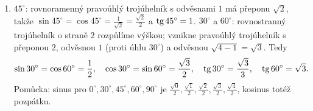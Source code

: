 \begin{enumerate}[label=\textbf{\arabic*.}, leftmargin=*, itemsep=0.8em]
  \item {}
  $45^\circ$: rovnoramenný pravoúhlý trojúhelník s odvěsnami $1$ má přeponu $\sqrt{2}$, takže $\sin 45^\circ = \cos 45^\circ = \frac{1}{\sqrt{2}} = \frac{\sqrt{2}}{2}$ a $\operatorname{tg} 45^\circ = 1$. $30^\circ$ a $60^\circ$: rovnostranný trojúhelník o straně $2$ rozpůlíme výškou; vznikne pravoúhlý trojúhelník s přeponou $2$, odvěsnou $1$ (proti úhlu $30^\circ$) a odvěsnou $\sqrt{4 - 1} = \sqrt{3}$. Tedy
  \begin{equation*}
    \sin 30^\circ = \cos 60^\circ = \frac{1}{2},\quad \cos 30^\circ = \sin 60^\circ = \frac{\sqrt{3}}{2},\quad \operatorname{tg} 30^\circ = \frac{\sqrt{3}}{3},\quad \operatorname{tg} 60^\circ = \sqrt{3}.
  \end{equation*}
  Pomůcka: sinus pro $0^\circ, 30^\circ, 45^\circ, 60^\circ, 90^\circ$ je $\frac{\sqrt{0}}{2}, \frac{\sqrt{1}}{2}, \frac{\sqrt{2}}{2}, \frac{\sqrt{3}}{2}, \frac{\sqrt{4}}{2}$, kosinus totéž pozpátku. 


\end{enumerate}
